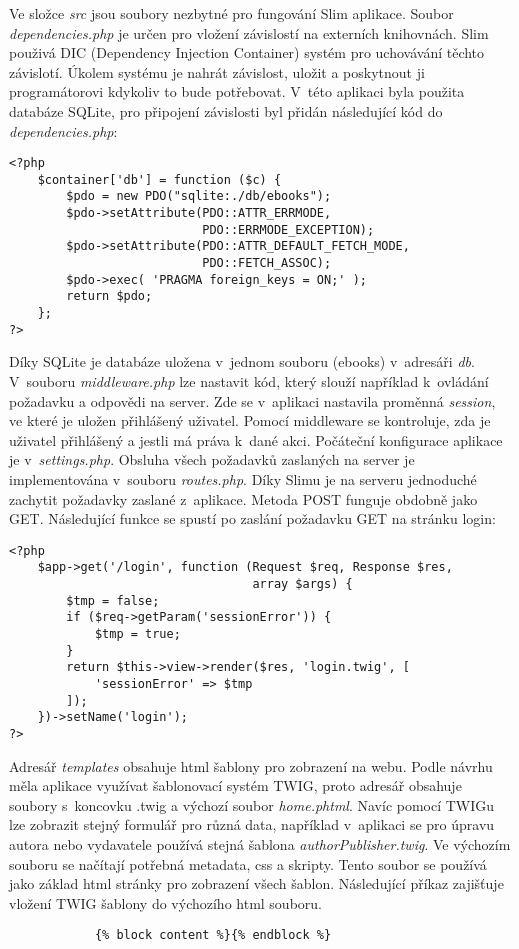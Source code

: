             Ve složce \textit{src} jsou soubory nezbytné pro fungování Slim aplikace. Soubor \textit{dependencies.php} je určen pro vložení závislostí na externích knihovnách. Slim použivá DIC (Dependency Injection Container) systém pro uchovávání těchto závislotí. Úkolem systému je nahrát závislost, uložit a poskytnout ji programátorovi kdykoliv to bude potřebovat. V~této aplikaci byla použita databáze SQLite, pro připojení závislosti byl přidán následující kód do \textit{dependencies.php}:
            \begin{verbatim}
<?php
    $container['db'] = function ($c) {
        $pdo = new PDO("sqlite:./db/ebooks");
        $pdo->setAttribute(PDO::ATTR_ERRMODE, 
                           PDO::ERRMODE_EXCEPTION);
        $pdo->setAttribute(PDO::ATTR_DEFAULT_FETCH_MODE, 
                           PDO::FETCH_ASSOC);
        $pdo->exec( 'PRAGMA foreign_keys = ON;' );
        return $pdo;
    };
?>
            \end{verbatim}
            Díky SQLite je databáze uložena v~jednom souboru (ebooks) v~adresáři \textit{db}. V~souboru \textit{middleware.php} lze nastavit kód, který slouží například k~ovládání požadavku a odpovědi na server. Zde se v~aplikaci nastavila proměnná \textit{session}, ve které je uložen přihlášený uživatel. Pomocí middleware se kontroluje, zda je uživatel přihlášený a jestli má práva k~dané akci.  Počáteční konfigurace aplikace je v~\textit{settings.php}. Obsluha všech požadavků zaslaných na server je implementována v~souboru \textit{routes.php}. Díky Slimu je na serveru jednoduché zachytit požadavky zaslané z~aplikace. Metoda POST funguje obdobně jako GET. Následující funkce se spustí po zaslání požadavku GET na stránku login:
            \pagebreak
            \begin{verbatim}
<?php
    $app->get('/login', function (Request $req, Response $res, 
                                  array $args) {
        $tmp = false;
        if ($req->getParam('sessionError')) {
            $tmp = true;
        }
        return $this->view->render($res, 'login.twig', [
            'sessionError' => $tmp
        ]);
    })->setName('login');
?>
            \end{verbatim}
            
            Adresář \textit{templates} obsahuje html šablony pro zobrazení na webu. Podle návrhu měla aplikace využívat šablonovací systém TWIG, proto adresář obsahuje soubory s~koncovku .twig a výchozí soubor \textit{home.phtml}. Navíc pomocí TWIGu lze zobrazit stejný formulář pro různá data, například v~aplikaci se pro úpravu autora nebo vydavatele používá stejná šablona \textit{authorPublisher.twig}. Ve výchozím souboru se načítají potřebná metadata, css a skripty. Tento soubor se používá jako základ html stránky pro zobrazení všech šablon. Následující příkaz zajišťuje vložení TWIG šablony do výchozího html souboru. 
            \begin{lstlisting}
            {% block content %}{% endblock %}
            \end{lstlisting}
             
